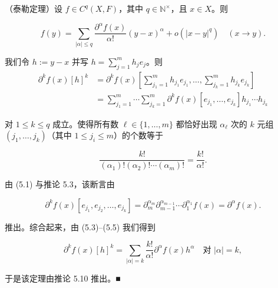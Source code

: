 \begin{theorem}

（泰勒定理）设 $ f \in C^{q}(X, F) $，其中 $ q \in \mathbb{N}^{\times} $，且 $ x \in X $。则

\[
f(y) = \sum_{|\alpha| \le q}\frac{\partial^{\alpha}f(x)}{\alpha!}(y - x)^{\alpha} + o(|x - y|^{q}) \quad (x \to y) .
\]

\proofhead
我们令 $ h := y - x $ 并写 $ h = \sum_{j=1}^{m}h_{j}e_{j} $。则
\begin{equation}
\begin{aligned}
\partial^{k}f(x)[h]^{k} &= \partial^{k}f(x)\left[ \sum_{j_{1}=1}^{m}h_{j_{1}}e_{j_{1}}, \ldots, \sum_{j_{k}=1}^{m}h_{j_{k}}e_{j_{k}} \right] \\ &= \sum_{j_{1}=1}^{m}\cdots\sum_{j_{k}=1}^{m}\partial^{k}f(x)[e_{j_{1}}, \ldots, e_{j_{k}}]h_{j_{1}}\cdots h_{j_{k}}
\end{aligned}\tag{5.3}
\end{equation}

对 $ 1 \le k \le q $ 成立。使得所有数 $ \ell \in \{1, \ldots, m\} $ 都恰好出现 $ \alpha_{\ell} $ 次的 $ k $ 元组 $ (j_{1}, \ldots, j_{k}) $（其中 $ 1 \le j_{i} \le m $）的个数等于

\begin{equation}
\frac{k!}{(\alpha_{1})!(\alpha_{2})!\cdots(\alpha_{m})!} = \frac{k!}{\alpha!} .\tag{5.4}
\end{equation}

由 (5.1) 与推论 5.3，该断言由

\begin{equation}
\partial^{k}f(x)[e_{j_{1}}, e_{j_{2}}, \ldots, e_{j_{k}}] = \partial_{m}^{\alpha_{m}}\partial_{m-1}^{\alpha_{m-1}}\cdots\partial_{1}^{\alpha_{1}}f(x) = \partial^{\alpha}f(x) .\tag{5.5}
\end{equation}

推出。综合起来，由 (5.3)–(5.5) 我们得到

\[
\partial^{k}f(x)[h]^{k} = \sum_{|\alpha| = k}\frac{k!}{\alpha!}\partial^{\alpha}f(x)h^{\alpha} \quad \text{对 } |\alpha| = k ,
\]

于是该定理由推论 5.10 推出。\nobreak\hspace{0.35em}■

\end{theorem}

